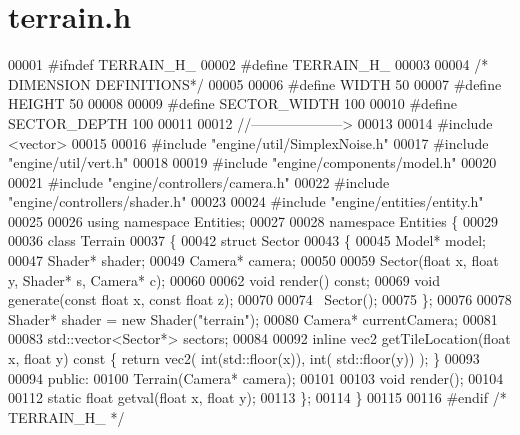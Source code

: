 \section{terrain.\+h}
\label{terrain_8h_source}

\begin{DoxyCode}
00001 \textcolor{preprocessor}{#ifndef TERRAIN\_H\_}
00002 \textcolor{preprocessor}{#define TERRAIN\_H\_}
00003 
00004 \textcolor{comment}{/* DIMENSION DEFINITIONS*/}
00005 
00006 \textcolor{preprocessor}{#define WIDTH  50}
00007 \textcolor{preprocessor}{#define HEIGHT 50}
00008 
00009 \textcolor{preprocessor}{#define SECTOR\_WIDTH 100}
00010 \textcolor{preprocessor}{#define SECTOR\_DEPTH 100}
00011 
00012 \textcolor{comment}{//-------------------->}
00013 
00014 \textcolor{preprocessor}{#include <vector>}
00015 
00016 \textcolor{preprocessor}{#include "engine/util/SimplexNoise.h"}
00017 \textcolor{preprocessor}{#include "engine/util/vert.h"}
00018 
00019 \textcolor{preprocessor}{#include "engine/components/model.h"}
00020 
00021 \textcolor{preprocessor}{#include "engine/controllers/camera.h"}
00022 \textcolor{preprocessor}{#include "engine/controllers/shader.h"}
00023 
00024 \textcolor{preprocessor}{#include "engine/entities/entity.h"}
00025 
00026 \textcolor{keyword}{using namespace }Entities;
00027 
00028 \textcolor{keyword}{namespace }Entities \{
00029     
00036     \textcolor{keyword}{class }Terrain
00037     \{
00042         \textcolor{keyword}{struct }Sector
00043         \{
00045             Model*  model;
00047             Shader* shader;
00049             Camera* camera;
00050 
00059             Sector(\textcolor{keywordtype}{float} x, \textcolor{keywordtype}{float} y, Shader* s, Camera* c);
00060 
00062             \textcolor{keywordtype}{void} render() \textcolor{keyword}{const};
00069             \textcolor{keywordtype}{void} generate(\textcolor{keyword}{const} \textcolor{keywordtype}{float} x, \textcolor{keyword}{const} \textcolor{keywordtype}{float} z);
00070 
00074             ~Sector();
00075         \};        
00076 
00078         Shader* shader = \textcolor{keyword}{new} Shader(\textcolor{stringliteral}{"terrain"});
00080         Camera* currentCamera;
00081 
00083         std::vector<Sector*> sectors;
00084 
00092         \textcolor{keyword}{inline} vec2 getTileLocation(\textcolor{keywordtype}{float} x, \textcolor{keywordtype}{float} y)\textcolor{keyword}{ const }\{ \textcolor{keywordflow}{return} vec2( \textcolor{keywordtype}{int}(std::floor(x)), \textcolor{keywordtype}{int}(
      std::floor(y)) ); \}
00093 
00094     \textcolor{keyword}{public}:
00100         Terrain(Camera* camera);
00101 
00103         \textcolor{keywordtype}{void} render();
00104 
00112         \textcolor{keyword}{static} \textcolor{keywordtype}{float} getval(\textcolor{keywordtype}{float} x, \textcolor{keywordtype}{float} y);
00113     \};
00114 \}
00115 
00116 \textcolor{preprocessor}{#endif }\textcolor{comment}{/* TERRAIN\_H\_ */}\textcolor{preprocessor}{}
\end{DoxyCode}
